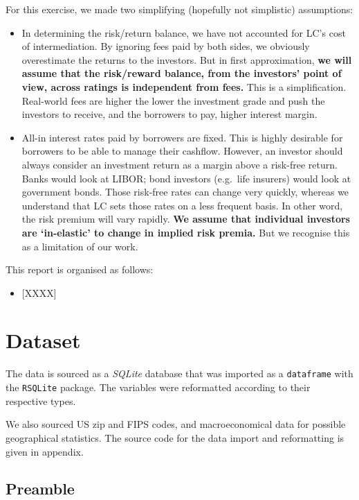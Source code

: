 \documentclass[11pt,]{report}
\providecommand{\tightlist}{%
  \setlength{\itemsep}{0pt}\setlength{\parskip}{0pt}}
\begin{document}
For this exercise, we made two simplifying (hopefully not simplistic) assumptions:

\begin{itemize}
\item
  In determining the risk/return balance, we have not accounted for LC's cost of intermediation. By ignoring fees paid by both sides, we obviously overestimate the returns to the investors. But in first approximation, \textbf{we will assume that the risk/reward balance, from the investors' point of view, across ratings is independent from fees.} This is a simplification. Real-world fees are higher the lower the investment grade and push the investors to receive, and the borrowers to pay, higher interest margin.
\item
  All-in interest rates paid by borrowers are fixed. This is highly desirable for borrowers to be able to manage their cashflow. However, an investor should always consider an investment return as a margin above a risk-free return. Banks would look at LIBOR; bond investors (e.g.~life insurers) would look at government bonds. Those risk-free rates can change very quickly, whereas we understand that LC sets those rates on a less frequent basis. In other word, the risk premium will vary rapidly. \textbf{We assume that individual investors are `in-elastic' to change in implied risk premia.} But we recognise this as a limitation of our work.
\end{itemize}

This report is organised as follows:

\begin{itemize}
\tightlist
\item
  {[}XXXX{]}
\end{itemize}

\hypertarget{dataset}{%
\chapter{Dataset}\label{dataset}}

The data is sourced as a \emph{SQLite} database that was imported as a \texttt{dataframe} with the \texttt{RSQLite} package. The variables were reformatted according to their respective types.

We also sourced US zip and FIPS codes, and macroeconomical data for possible geographical statistics. The source code for the data import and reformatting is given in appendix.

\hypertarget{preamble}{%
\section{Preamble}\label{preamble}}
\end{document}
